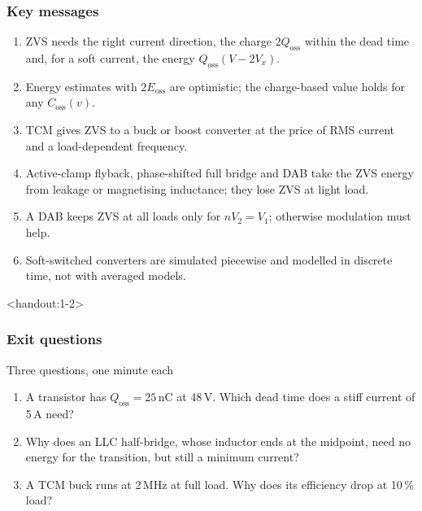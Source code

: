 \begin{frame}
	\frametitle{Key messages}
	\begin{enumerate}
		\item ZVS needs the right current direction, the charge $2Q_\mathrm{oss}$ within the dead time and, for a soft current, the energy $Q_\mathrm{oss}(V-2V_x)$.
		\item Energy estimates with $2E_\mathrm{oss}$ are optimistic; the charge-based value holds for any $C_\mathrm{oss}(v)$.
		\item TCM gives ZVS to a buck or boost converter at the price of RMS current and a load-dependent frequency.
		\item Active-clamp flyback, phase-shifted full bridge and DAB take the ZVS energy from leakage or magnetising inductance; they lose ZVS at light load.
		\item A DAB keeps ZVS at all loads only for $nV_2=V_1$; otherwise modulation must help.
		\item Soft-switched converters are simulated piecewise and modelled in discrete time, not with averaged models.
	\end{enumerate}
\end{frame}

\begin{frame}<handout:1-2>
	\frametitle{Exit questions}
	\begin{varblock}[\textwidth]{Three questions, one minute each}
		\begin{enumerate}
			\item A transistor has $Q_\mathrm{oss}=25$\,nC at 48\,V. Which dead time does a stiff current of 5\,A need?
			\item Why does an LLC half-bridge, whose inductor ends at the midpoint, need no energy for the transition, but still a minimum current?
			\item A TCM buck runs at 2\,MHz at full load. Why does its efficiency drop at 10\,\% load?
		\end{enumerate}
	\end{varblock}
\end{frame}

